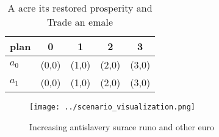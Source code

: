 \documentclass[a4paper]{article}
\begin{document}
\begin{table}
\begin{adjustbox}{width=0.7\columnwidth}
\begin{tabular}{|l|l|l|l|l|}
\hline
\textbf{plan} & \multicolumn{1}{c|}{\textbf{0}} & \multicolumn{1}{c|}{\textbf{1}} & \multicolumn{1}{c|}{\textbf{2}} & \multicolumn{1}{c|}{\textbf{3}} \\ \hline
\textbf{$a_0$}  & (0,0) & (1,0) & (2,0) & (3,0) \\ \hline
\textbf{$a_1$}  & (0,0) & (1,0) & (2,0) & (3,0) \\ \hline
\end{tabular}
\end{adjustbox}
\caption{A acre its restored prosperity and Trade an emale
}
\end{table}

\begin{figure}
\centering
\texttt{[image: ../scenario\_visualization.png]}
\caption{Increasing antislavery surace runo and other euro
}
\end{figure}
 
\end{document}
